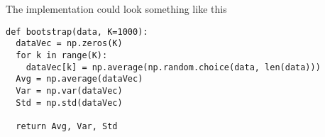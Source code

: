 The implementation could look something like this
\lstset{basicstyle=\scriptsize}
\begin{lstlisting}
def bootstrap(data, K=1000):
  dataVec = np.zeros(K)
  for k in range(K):
    dataVec[k] = np.average(np.random.choice(data, len(data)))
  Avg = np.average(dataVec)
  Var = np.var(dataVec)
  Std = np.std(dataVec)
    
  return Avg, Var, Std
\end{lstlisting}
